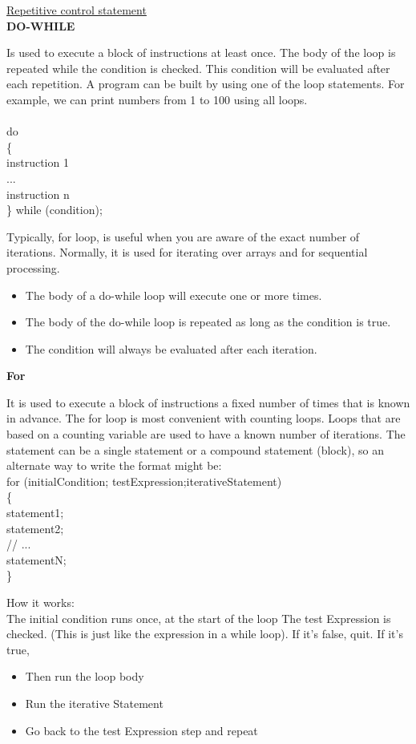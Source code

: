 \documentclass[11pt, letterpaper, english]{article}
\begin{document}
    \underline{Repetitive control statement}\\
    \textbf{DO-WHILE}\\
    \par{Is used to execute a block of instructions at least once. The body of the loop is repeated while the condition is checked. This condition will be evaluated after each repetition. A program can be built by using one of the loop statements. For example, we can print numbers from 1 to 100 using all loops.}\\ \\
    do\\
    \{ \\
    instruction 1 \\
    ... \\
    instruction n\\
    \} while (condition); \\
    \par{Typically, for loop, is useful when you are aware of the exact number of iterations. Normally, it is used for iterating over arrays and for sequential processing.}
    
    \begin{itemize}
\item The body of a do-while loop will execute one or more times.
\item The body of the do-while loop is repeated as long as the condition is true.
\item The condition will always be evaluated after each iteration.
\end{itemize} \vspace{0.5 cm}
\textbf{For} \vspace{0.5 cm}
\par{It is used to execute a block of instructions a fixed number of times that is known in advance. The for loop is most convenient with counting loops. Loops that are based on a counting variable are used to have a known number of iterations. The statement can be a single statement or a compound statement (block), so an alternate way to write the format might be:}\\

    for (initialCondition; testExpression;iterativeStatement)\\ 
 \{\\
    statement1;\\
    statement2;\\
    // ...\\
    statementN;\\
 \}\\
\par{How it works:\\
The initial condition runs once, at the start of the loop
The test Expression is checked. (This is just like the expression in a while loop). If it's false, quit. If it's true,
\begin{itemize}
    \item Then run the loop body
    \item Run the iterative Statement
    \item Go back to the test Expression step and repeat
\end{itemize}
}
    
\end{document}
